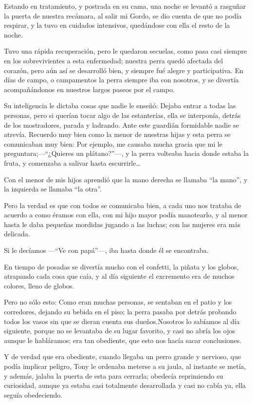 \documentclass[letterpaper, 12pt]{book}
\begin{document}
Estando en tratamiento, y postrada en su cama, una noche se levantó a rasguñar la puerta de nuestra recámara, al salir mi Gordo, se dio cuenta de que no podía respirar, y  la tuvo en cuidados intensivos, quedándose con ella el resto de la noche.

Tuvo una rápida recuperación, pero le quedaron secuelas, como pasa casi siempre en los sobrevivientes a esta enfermedad; nuestra perra quedó afectada del corazón, pero aún así se desarrolló bien, y siempre fué alegre y participativa. En días de campo, o campamentos la perra siempre iba con nosotros, y se divertía acompañándonos en nuestros largos paseos por el campo.

Su inteligencia le dictaba cosas que nadie le enseñó: Dejaba entrar a todas las personas, pero si querían tocar algo de las estanterías, ella se interponía, detrás de los mostradores, parada y ladrando. Ante este guardián formidable nadie se atrevía.
Recuerdo muy bien como la menor de nuestras hijas y esta perra se comunicaban muy bien: Por ejemplo, me causaba mucha gracia que mi le preguntara;---``¿Quieres un plátano?''---, y la perra volteaba hacia donde estaba la fruta, y comenzaba a salivar hasta escurrirle\ldots

Con el menor de mis hijos aprendió que la mano derecha se llamaba ``la mano'', y la izquierda se llamaba ``la otra''. 

Pero la verdad es que con todos se comunicaba bien, a cada uno nos trataba de acuerdo a como éramos con ella, con mi hijo mayor podía manotearlo, y al menor hasta le daba pequeñas mordidas jugando a las luchas; con las mujeres era más delicada.  

Si le decíamos ---``Ve con papá''---, iba hasta donde él se encontraba.

En tiempo de posadas se divertía mucho con el confetti, la piñata y los globos, atrapando cada cosa que caía, y al día siguiente el excremento era de muchos colores, lleno de globos. 

Pero no sólo esto: Como eran muchas personas, se sentaban en el patio y los corredores, dejando su bebida en el piso; la perra pasaba por detrás probando todos los vasos sin que se dieran cuenta sus dueños.Nosotros lo sabíamos al día siguiente, porque no se levantaba de su lugar favorito, y casi no abría los ojos aunque le habláramos; era tan obediente, que esto nos hacía sacar conclusiones.

Y de verdad que era obediente, cuando llegaba un perro grande y nervioso, que podía implicar peligro, Tony le ordenaba meterse a su jaula, al instante se metía, y además, jalaba la puerta de esta para cerrarla; obedecía reprimiendo su curiosidad, aunque ya estaba casi totalmente desarrollada y casi no cabía ya, ella seguía obedeciendo.
\end{document}
